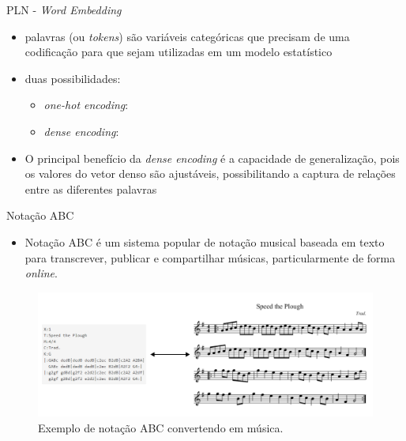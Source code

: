 \documentclass{beamer}
\begin{document}
    \begin{frame}{PLN - \textit{Word Embedding}}
        \begin{itemize}
            \justifying
            \item palavras (ou \textit{tokens}) são variáveis categóricas que precisam de uma codificação para que sejam utilizadas em um modelo estatístico
            \item duas possibilidades:
            \begin{itemize}
                \item \textit{one-hot encoding}:
                \item \textit{dense encoding}:
            \end{itemize}
            \item O principal benefício da \textit{dense encoding} é a capacidade de generalização, pois os valores do vetor denso são ajustáveis, possibilitando a captura de relações entre as diferentes palavras
        \end{itemize}
    \end{frame}

    \begin{frame}{Notação ABC}
        \vspace{0.1cm}
        \begin{itemize}
            \justifying
            \item Notação ABC é um sistema popular de notação musical baseada em texto para transcrever, publicar e compartilhar músicas, particularmente de forma \textit{online}. 
        \end{itemize}

        \begin{figure}
            \vspace{-0.5cm}
            \centering
            \includegraphics[scale=0.25]{figuras/abc_notation_example.pdf}
	        \caption{Exemplo de notação ABC convertendo em música.}
        \end{figure}
    \end{frame}
\end{document}
